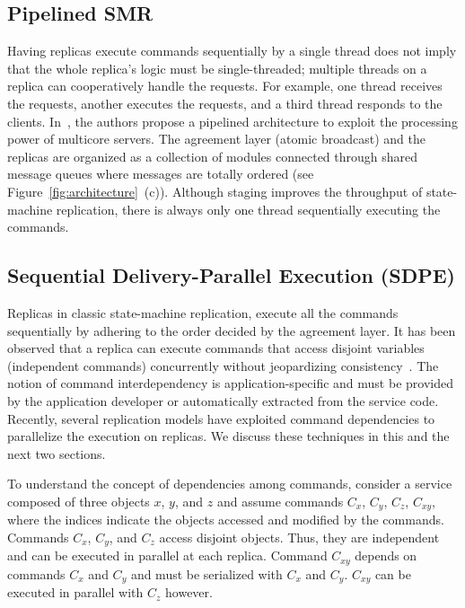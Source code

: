 \documentclass[conference]{IEEEtran}
\begin{document}
\subsection{Pipelined SMR}
\label{sec:pipelinedsmr}
Having replicas execute commands sequentially by a single thread does not imply that the whole replica's logic must be single-threaded; multiple threads on a replica can cooperatively handle the requests. For example, one thread receives the requests, another executes the requests, and a third thread responds to the clients. 
In~\cite{SS2011}, the authors propose a pipelined architecture to exploit the processing power of multicore servers. 
The agreement layer (atomic broadcast) and the replicas are organized as a collection of modules connected through shared message queues where messages are totally ordered (see Figure~\ref{fig:architecture}~(c)). 
Although staging improves the throughput of state-machine replication, there is always only one thread sequentially executing the commands. 


\subsection{Sequential Delivery-Parallel Execution (SDPE)}
\label{sec:sdpe}

Replicas in classic state-machine replication, execute all the commands sequentially by adhering to the order decided by the agreement layer. 
It has been observed that a replica can execute commands that access disjoint variables (independent commands) concurrently without jeopardizing consistency~\cite{Sch90}. 
The notion of command interdependency is application-specific and must be provided by the application developer or automatically extracted from the service code. Recently, several replication models have exploited command dependencies to parallelize the execution on replicas. 
We discuss these techniques in this and the next two sections. 

To understand the concept of dependencies among commands, consider a service composed of three objects $x$, $y$, and $z$ and assume commands $C_{x}$, $C_{y}$, $C_{z}$, $C_{xy}$, where the indices indicate the objects accessed and modified by the commands. 
Commands $C_{x}$, $C_{y}$, and $C_{z}$ access disjoint objects.
Thus, they are independent and can be executed in parallel at each replica. 
Command $C_{xy}$ depends on commands $C_{x}$ and $C_{y}$ and must be serialized with $C_{x}$ and $C_{y}$. 
$C_{xy}$ can be executed in parallel with $C_{z}$ however. 
\end{document}
